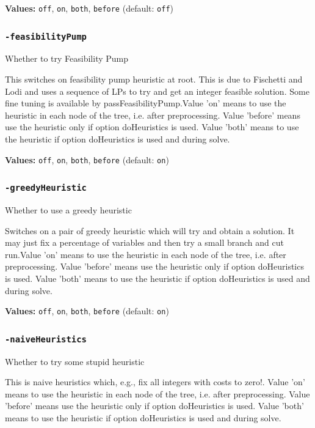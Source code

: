 \documentclass[11pt,a4paper]{article}
\begin{document}
\textbf{Values:} \texttt{off}, \texttt{on}, \texttt{both}, \texttt{before} (default: \texttt{off})

\subsubsection*{\texttt{-feasibilityPump}}

Whether to try Feasibility Pump

This switches on feasibility pump heuristic at root. This is due to Fischetti and Lodi and uses a sequence of LPs to try and get an integer feasible solution.  Some fine tuning is available by passFeasibilityPump.Value 'on' means to use the heuristic in each node of the tree, i.e. after preprocessing. Value 'before' means use the heuristic only if option doHeuristics is used. Value 'both' means to use the heuristic if option doHeuristics is used and during solve.

\textbf{Values:} \texttt{off}, \texttt{on}, \texttt{both}, \texttt{before} (default: \texttt{on})

\subsubsection*{\texttt{-greedyHeuristic}}

Whether to use a greedy heuristic

Switches on a pair of greedy heuristic which will try and obtain a solution.  It may just fix a percentage of variables and then try a small branch and cut run.Value 'on' means to use the heuristic in each node of the tree, i.e. after preprocessing. Value 'before' means use the heuristic only if option doHeuristics is used. Value 'both' means to use the heuristic if option doHeuristics is used and during solve.

\textbf{Values:} \texttt{off}, \texttt{on}, \texttt{both}, \texttt{before} (default: \texttt{on})

\subsubsection*{\texttt{-naiveHeuristics}}

Whether to try some stupid heuristic

This is naive heuristics which, e.g., fix all integers with costs to zero!. Value 'on' means to use the heuristic in each node of the tree, i.e. after preprocessing. Value 'before' means use the heuristic only if option doHeuristics is used. Value 'both' means to use the heuristic if option doHeuristics is used and during solve.
\end{document}
